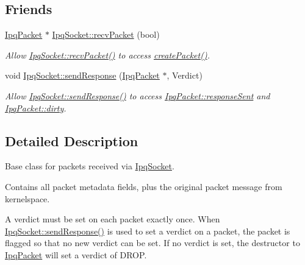 \subsection*{\-Friends}
\begin{DoxyCompactItemize}
\item 
\hyperlink{classIPQ_1_1IpqPacket}{\-Ipq\-Packet} $\ast$ \hyperlink{classIPQ_1_1IpqPacket_aadeb2b46a6c95963cc3edeb5638e360d}{\-Ipq\-Socket\-::recv\-Packet} (bool)
\begin{DoxyCompactList}\small\item\em \-Allow \hyperlink{classIPQ_1_1IpqSocket_aff35b95d33b21474f844660fef28938c}{\-Ipq\-Socket\-::recv\-Packet()} to access \hyperlink{classIPQ_1_1IpqPacket_adf6099052730113814e9fe7312ec7b8c}{create\-Packet()}. \end{DoxyCompactList}\item 
void \hyperlink{classIPQ_1_1IpqPacket_ac2316baee2ac9361e950dc6e059859aa}{\-Ipq\-Socket\-::send\-Response} (\hyperlink{classIPQ_1_1IpqPacket}{\-Ipq\-Packet} $\ast$, \-Verdict)
\begin{DoxyCompactList}\small\item\em \-Allow \hyperlink{classIPQ_1_1IpqSocket_a53e0f4e45363cbcd919a2d96ee7cf0a8}{\-Ipq\-Socket\-::send\-Response()} to access \hyperlink{classIPQ_1_1IpqPacket_aa1a2044e8f04423ccc68a4c0a2142c6b}{\-Ipq\-Packet\-::response\-Sent} and \hyperlink{classIPQ_1_1IpqPacket_a00acebf51531043a8536f20bb9412d61}{\-Ipq\-Packet\-::dirty}. \end{DoxyCompactList}\end{DoxyCompactItemize}


\subsection{\-Detailed \-Description}
\-Base class for packets received via \hyperlink{classIPQ_1_1IpqSocket}{\-Ipq\-Socket}. 

\-Contains all packet metadata fields, plus the original packet message from kernelspace.

\-A verdict must be set on each packet exactly once. \-When \hyperlink{classIPQ_1_1IpqSocket_a53e0f4e45363cbcd919a2d96ee7cf0a8}{\-Ipq\-Socket\-::send\-Response()} is used to set a verdict on a packet, the packet is flagged so that no new verdict can be set. \-If no verdict is set, the destructor to \hyperlink{classIPQ_1_1IpqPacket}{\-Ipq\-Packet} will set a verdict of \-D\-R\-O\-P.

